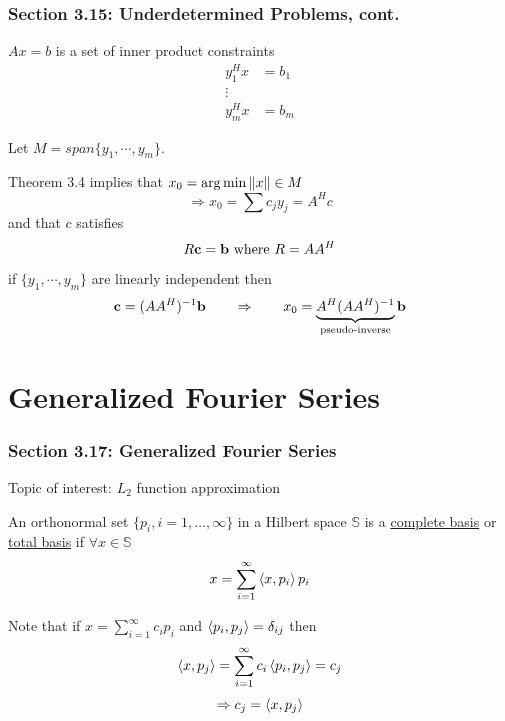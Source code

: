 \documentclass{beamer}
\begin{document}
\begin{frame}\frametitle{Section 3.15: Underdetermined Problems, cont.}
	$Ax = b$ is a set of inner product constraints
	\begin{align*}
	y_1^Hx &= b_1\\
	\vdots\\
	y_m^Hx &= b_m
	\end{align*}
	
	\vfill
	
	Let $M = span\{y_1, \cdots, y_m\}$.
	
	\vfill
	
	Theorem 3.4 implies that $x_0 = \arg\min\left\|x \right\| \in M$
	\[ \Rightarrow x_0 = \sum c_jy_j = A^Hc \]
	and that $c$ satisfies
	\[ R\mathbf{c} = \mathbf{b} \text{ where } R = AA^H \]
	if $\{y_1, \cdots, y_m\}$ are linearly independent then
	\[ \mathbf{c} = (AA^H)^{-1}\mathbf{b} \qquad \Rightarrow \qquad x_0 =
	\underbrace{A^H(AA^H)^{-1}}_{\text{pseudo-inverse}}\mathbf{b} \]	
\end{frame}


	


\section{Generalized Fourier Series}
\frame{\sectionpage}

\begin{frame}\frametitle{Section 3.17: Generalized Fourier Series}

	Topic of interest: $L_2$ function approximation
	
	\vfill

	\begin{definition}
	An orthonormal set $\{p_i, i=1, \ldots, \infty\}$ in a Hilbert space
	$\mathbb{S}$ is a \underline{complete basis} or \underline{total basis} if
	$\forall x \in \mathbb{S}$
	\[ x = \sum_{i=1}^{\infty} \left<x,p_i \right>p_i \]
	\end{definition}
	
	\vfill

	Note that if $x = \sum_{i=1}^{\infty} c_ip_i$ and $\left<p_i,p_j \right> =
	\delta_{ij}$ then
	\[ \left<x,p_j \right> = \sum_{i=1}^{\infty}c_i\left<p_i,p_j \right>=c_j\]
	\[ \Rightarrow c_j = \left<x,p_j \right> \]

	
\end{frame}
\end{document}
